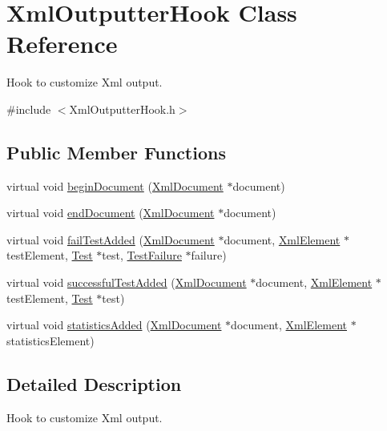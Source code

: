 \hypertarget{class_xml_outputter_hook}{}\section{Xml\+Outputter\+Hook Class Reference}
\label{class_xml_outputter_hook}


Hook to customize Xml output.  




{\ttfamily \#include $<$Xml\+Outputter\+Hook.\+h$>$}

\subsection*{Public Member Functions}
\begin{DoxyCompactItemize}
\item 
virtual void \hyperlink{class_xml_outputter_hook_a1d2b5d5d0fc42d273d6430522a70ccbb}{begin\+Document} (\hyperlink{class_xml_document}{Xml\+Document} $\ast$document)
\item 
virtual void \hyperlink{class_xml_outputter_hook_a300e2a4ef46db4e76428e32f7c7e6a23}{end\+Document} (\hyperlink{class_xml_document}{Xml\+Document} $\ast$document)
\item 
virtual void \hyperlink{class_xml_outputter_hook_a77310985e055cc2c67e91a42c524fbbe}{fail\+Test\+Added} (\hyperlink{class_xml_document}{Xml\+Document} $\ast$document, \hyperlink{class_xml_element}{Xml\+Element} $\ast$test\+Element, \hyperlink{class_test}{Test} $\ast$test, \hyperlink{class_test_failure}{Test\+Failure} $\ast$failure)
\item 
virtual void \hyperlink{class_xml_outputter_hook_adbcf6ad2cb85d6f1015306fadb7eadcf}{successful\+Test\+Added} (\hyperlink{class_xml_document}{Xml\+Document} $\ast$document, \hyperlink{class_xml_element}{Xml\+Element} $\ast$test\+Element, \hyperlink{class_test}{Test} $\ast$test)
\item 
virtual void \hyperlink{class_xml_outputter_hook_a0e602260274d4f005affb4ee84ce4c4a}{statistics\+Added} (\hyperlink{class_xml_document}{Xml\+Document} $\ast$document, \hyperlink{class_xml_element}{Xml\+Element} $\ast$statistics\+Element)
\end{DoxyCompactItemize}


\subsection{Detailed Description}
Hook to customize Xml output. 


